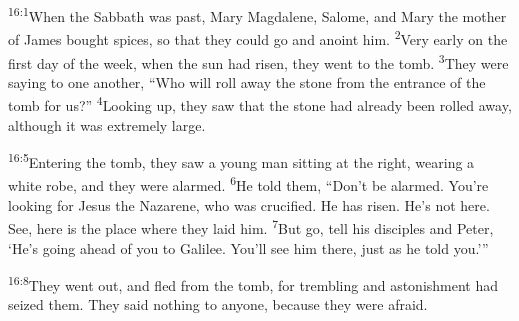 \documentclass[openany,12pt,english]{book}
\newenvironment{para}{\par\pretolerance=100\tolerance=200\setlength{\emergencystretch}{0.6em}\relax}{\par}
\begin{document}
\bigskip{}

\begin{para}
    \textsuperscript{16:1}\thinspace{}When the Sabbath was past, Mar\-y Mag\-da\-lene, Salome, and Mar\-y the moth\-er of James bought spices, so that they could go and a\-noint him.
    \textsuperscript{2}\thinspace{}Ver\-y ear\-ly on the first day of the week, when the sun had ris\-en, they went to the tomb.
    \textsuperscript{3}\thinspace{}They were say\-ing to one an\-oth\-er, “Who will roll a\-way the stone from the en\-trance of the tomb for us?”
    \textsuperscript{4}\thinspace{}Looking up, they saw that the stone had al\-read\-y been rolled a\-way, al\-though it was ex\-treme\-ly large.
\end{para}

\begin{para}
    \textsuperscript{16:5}\thinspace{}Entering the tomb, they saw a young man sit\-ting at the right, wear\-ing a white robe, and they were alarmed.
    \textsuperscript{6}\thinspace{}He told them, “Don't be alarmed. You're looking for Jesus the Nazarene, who was cru\-ci\-fied. He has ris\-en. He's not here. See, here is the place where they laid him.
    \textsuperscript{7}\thinspace{}But go, tell his disciples and Pe\-ter, ‘He's go\-ing a\-head of you to Gal\-i\-lee. You'll see him there, just as he told you.’”
\end{para}

\begin{para}
    \textsuperscript{16:8}\thinspace{}They went out, and fled from the tomb, for trem\-bling and as\-ton\-ish\-ment had seized them. They said noth\-ing to any\-one, be\-cause they were a\-fraid.
\end{para}
\end{document}

